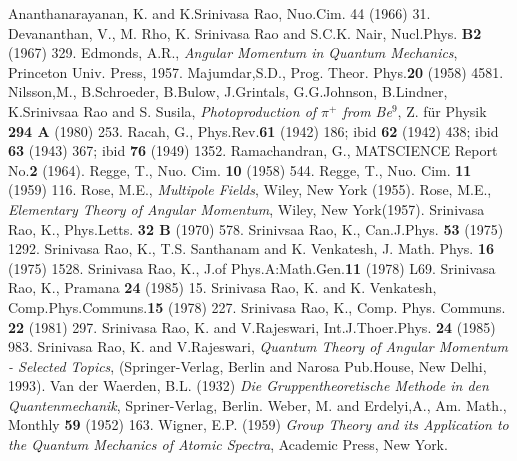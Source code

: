 \begin{thebibliography}{99}
 Ananthanarayanan, K. and K.Srinivasa Rao, Nuo.Cim. 44 (1966) 31.
 Devananthan, V., M. Rho, K. Srinivasa Rao and S.C.K. Nair, Nucl.Phys. {\bf B2} (1967) 329.
 Edmonds, A.R., \textit{Angular Momentum in Quantum Mechanics}, Princeton Univ. Press, 1957.
 Majumdar,S.D., Prog. Theor. Phys.{\bf 20} (1958) 4581.
 Nilsson,M., B.Schroeder, B.Bulow, J.Grintals, G.G.Johnson, B.Lindner, K.Srinivsaa Rao and S. Susila, \textit{Photoproduction of $\pi^+$ from Be$^9$}, Z. f\"{u}r Physik {\bf 294 A} (1980) 253.
 Racah, G., Phys.Rev.{\bf 61} (1942) 186; ibid {\bf 62} (1942) 438; ibid {\bf 63} (1943) 367; ibid {\bf 76} (1949) 1352.
 Ramachandran, G., MATSCIENCE Report No.{\bf 2} (1964).
 Regge, T., Nuo. Cim. {\bf 10} (1958) 544.
 Regge, T., Nuo. Cim. {\bf 11} (1959) 116.
 Rose, M.E., \textit{Multipole Fields}, Wiley, New York (1955).
 Rose, M.E., \textit{Elementary Theory of Angular Momentum}, Wiley, New York(1957).
 Srinivasa Rao, K., Phys.Letts. {\bf 32 B} (1970) 578.
 Srinivsaa Rao, K., Can.J.Phys. {\bf 53} (1975) 1292.
 Srinivasa Rao, K., T.S. Santhanam and K. Venkatesh, J. Math. Phys. {\bf 16} (1975) 1528.
 Srinivasa Rao, K., J.of Phys.A:Math.Gen.{\bf 11} (1978) L69.
 Srinivasa Rao, K., Pramana {\bf 24} (1985) 15.
 Srinivasa Rao, K. and K. Venkatesh, Comp.Phys.Communs.{\bf 15} (1978) 227.
 Srinivasa Rao, K., Comp. Phys. Communs. {\bf 22} (1981) 297.
 Srinivasa Rao, K. and V.Rajeswari, Int.J.Thoer.Phys. {\bf 24} (1985) 983.
 Srinivasa Rao, K. and V.Rajeswari, \textit{Quantum Theory of Angular Momentum - Selected Topics}, (Springer-Verlag, Berlin and Narosa Pub.House, New Delhi, 1993).
 Van der Waerden, B.L. (1932) \textit{Die Gruppentheoretische Methode in den Quantenmechanik}, Spriner-Verlag, Berlin.
 Weber, M. and Erdelyi,A., Am. Math., Monthly {\bf 59} (1952) 163.
 Wigner, E.P. (1959) \textit{Group Theory and its Application to the Quantum Mechanics of Atomic Spectra}, Academic Press, New York.
\end{thebibliography}


